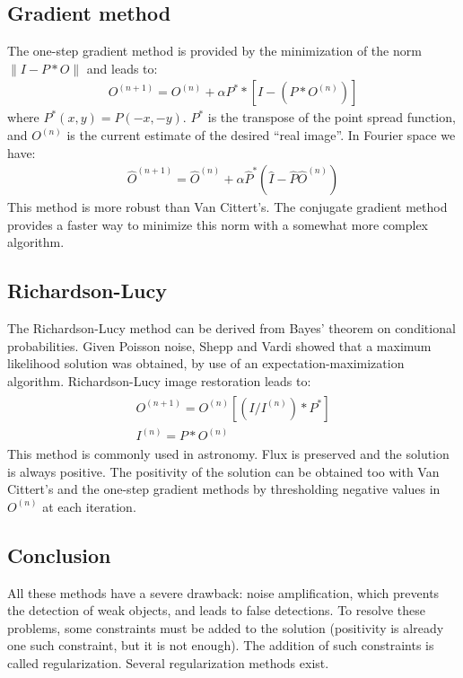 \subsection*{Gradient method}

The one-step gradient method is provided by the minimization of the norm 
$\parallel I  - P * O \parallel$ \cite{rest:landweber51}
and leads to:
\begin{eqnarray}
O^{(n+1)} = O^{(n)} + \alpha P^* * [I - (P * O^{(n)})]
\label{eqn_carre}
\end{eqnarray}
\noindent where $P^*(x,y)=P(-x,-y)$. $P^*$ is the transpose of the point
spread function, 
and $O^{(n)}$ is the current estimate of the desired ``real image''.  
In Fourier space we have:
\begin{eqnarray}
\hat{O}^{(n+1)} = \hat{O}^{(n)}  + \alpha \hat{P}^* (\hat{I} - \hat{P}  \hat{O}^{(n)})
\end{eqnarray}
 This method is more robust than Van Cittert's. The conjugate gradient 
method provides a faster 
way to minimize this norm with a somewhat more complex algorithm.

\subsection*{Richardson-Lucy}
The Richardson-Lucy
method \cite{rest:richardson72,rest:lucy74} can be  derived from Bayes' theorem on conditional
probabilities.  Given Poisson noise, Shepp and Vardi \cite{rest:shepp82}
showed that a maximum likelihood solution was obtained, by use of an 
expectation-maximization algorithm.   Richardson-Lucy image restoration 
leads to:
\begin{eqnarray}
\begin{array}{l}
O^{(n+1)} =  O^{(n)} [ (I/I^{(n)}) \ast P^* ]    \\
 I^{(n)} = P \ast O^{(n)} 
\end{array}
\label{eqn_lucy}
\end{eqnarray}
This method is commonly used in astronomy.
Flux is preserved and the solution is always positive. The positivity 
of the solution can be obtained too with Van Cittert's and the 
one-step gradient
methods by thresholding negative values in $O^{(n)}$ at each iteration.

\subsection*{Conclusion}
All these methods have a severe drawback:  noise amplification,
which prevents the detection of weak objects, and leads to false
detections. To resolve these problems, some constraints must be added to
the solution (positivity is already one such constraint, 
but it is not enough). The addition
of such constraints is called regularization. Several regularization methods 
exist.


